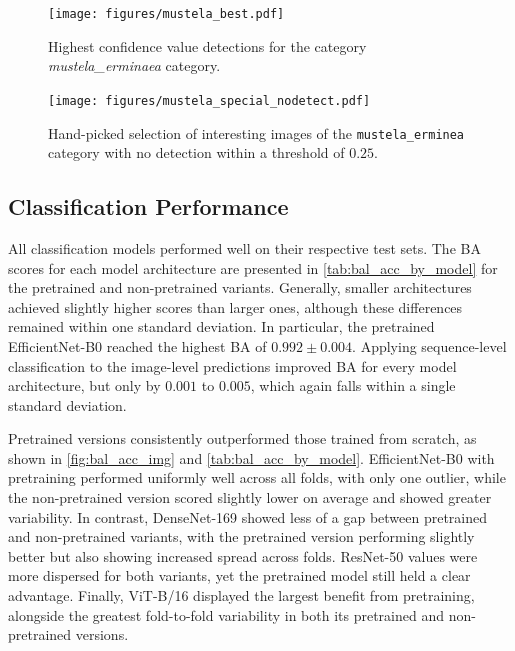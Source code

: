 

\begin{figure}[p]
\centering
\texttt{[image: figures/mustela\_best.pdf]}
\caption{Highest confidence value detections for the category \textit{mustela\_erminaea} category.}
\label{fig:detection_mustela_best}
\end{figure}

\begin{figure}[p]
\centering
\texttt{[image: figures/mustela\_special\_nodetect.pdf]}
\caption{Hand-picked selection of interesting images of the \texttt{mustela\_erminea} category with no detection within a threshold of \(0.25\).}
\label{fig:detection_special_nodetect}
\end{figure}

\subsection{Classification Performance}
All classification models performed well on their respective test sets.
The \ac{BA} scores for each model architecture are presented in \autoref{tab:bal_acc_by_model} for the pretrained and non-pretrained variants.
Generally, smaller architectures achieved slightly higher scores than larger ones, although these differences remained within one standard deviation.
In particular, the pretrained EfficientNet-B0 reached the highest \ac{BA} of \(0.992\pm0.004\).
Applying sequence-level classification to the image-level predictions improved \ac{BA} for every model architecture, but only by \(0.001\) to \(0.005\), which again falls within a single standard deviation.

Pretrained versions consistently outperformed those trained from scratch, as shown in \autoref{fig:bal_acc_img} and \autoref{tab:bal_acc_by_model}.
EfficientNet-B0 with pretraining performed uniformly well across all folds, with only one outlier, while the non-pretrained version scored slightly lower on average and showed greater variability.
In contrast, DenseNet-169 showed less of a gap between pretrained and non-pretrained variants, with the pretrained version performing slightly better but also showing increased spread across folds.
ResNet-50 values were more dispersed for both variants, yet the pretrained model still held a clear advantage.
Finally, ViT-B/16 displayed the largest benefit from pretraining, alongside the greatest fold-to-fold variability in both its pretrained and non-pretrained versions.

